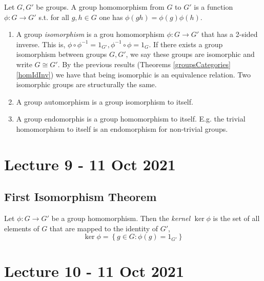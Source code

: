 \documentclass[11pt]{scrartcl}
\begin{document}
\begin{definition}
  Let $G,G'$ be groups. A group homomorphism from $G$ to $G'$ is a function $\phi:G\to G'$
  s.t. for all $g,h\in G$ one has $\phi(gh)=\phi(g) \phi(h)$.
  \label{groupHomomorphism}
\end{definition}

\begin{definition}
  \begin{enumerate}
    \item A group \emph{isomorphism} is a grou homomorphism $\phi:G\to G'$ that has a
      2-sided inverse. This is, $\phi\circ\phi^{-1}=1_{G'},\phi^{-1}\circ\phi=1_G$. If
      there exists a group isomorphism between groups $G,G'$, we say these groups are
      isomorphic and write $G\cong G'$. By the previous results (Theorems
      \ref{groupsCategories} \ref{homIdInv}) we have that being isomorphic is an
      equivalence relation. Two isomorphic groups are structurally the same.

    \item A group automorphism is a group isomorphism to itself.
    \item A group endomorphis is a group homomorphism to itself. E.g. the trivial
      homomorphism to itself is an endomorphism for non-trivial groups.
  \end{enumerate}
  \label{morphismZoo}
\end{definition}

\section{Lecture 9 - 11 Oct 2021}

\subsection{First Isomorphism Theorem}

\begin{definition} 
  Let $\phi:G\to G'$ be a group homomorphism. Then the \emph{kernel} $\ker\phi$ is the set
  of all elements of $G$ that are mapped to the identity of $G'$,
  \[\ker \phi = \left\{ g\in G : \phi(g)=1_{G'} \right\}\]
  \label{kernel}
\end{definition}

\section{Lecture 10 - 11 Oct 2021}
\end{document}
